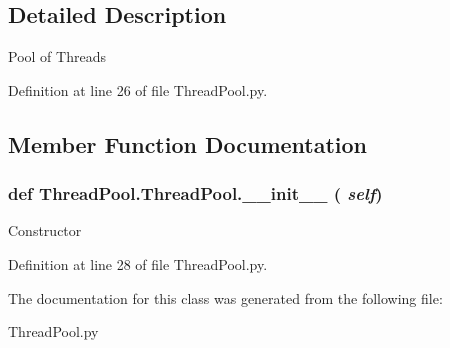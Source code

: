 \subsection{Detailed Description}
\begin{DoxyVerb}Pool of Threads \end{DoxyVerb}
 

Definition at line 26 of file ThreadPool.py.

\subsection{Member Function Documentation}
\hypertarget{classThreadPool_1_1ThreadPool_ab14b61ee7e1bcde3acd5302980bb5064}{
\subsubsection[{\_\-\_\-init\_\-\_\-}]{\setlength{\rightskip}{0pt plus 5cm}def ThreadPool.ThreadPool.\_\-\_\-init\_\-\_\- ( {\em self})}}
\label{classThreadPool_1_1ThreadPool_ab14b61ee7e1bcde3acd5302980bb5064}
\begin{DoxyVerb}Constructor \end{DoxyVerb}
 

Definition at line 28 of file ThreadPool.py.

The documentation for this class was generated from the following file:\begin{DoxyCompactItemize}
\item 
ThreadPool.py\end{DoxyCompactItemize}
